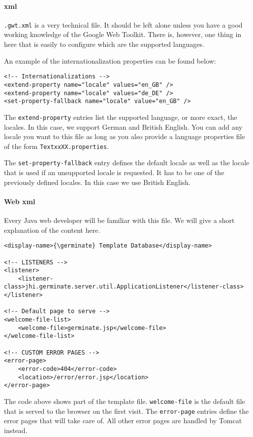 \paragraph{{\germinate} xml}
\texttt{{\germinate}.gwt.xml} is a very technical file. It should be left alone unless you have a good working knowledge of the Google Web Toolkit. There is, however, one thing in here that is easily to configure which are the supported languages.

An example of the internationalization properties can be found below:
\begin{lstlisting}[style=Xml]
<!-- Internationalizations -->
<extend-property name="locale" values="en_GB" />
<extend-property name="locale" values="de_DE" />
<set-property-fallback name="locale" value="en_GB" />
\end{lstlisting}
\noindent
The \texttt{extend-property} entries list the supported language, or more exact, the locales. In this case, we support German and British English. You can add any locale you want to this file as long as you also provide a language properties file of the form \texttt{Text\textunderscore xx\textunderscore XX.properties}.

The \texttt{set-property-fallback} entry defines the default locale as well as the locale that is used if an unsupported locale is requested. It has to be one of the previously defined locales. In this case we use British English.

\paragraph{Web xml}
Every Java web developer will be familiar with this file. We will give a short explanation of the content here.
\begin{lstlisting}[style=Xml]
<display-name>{\germinate} Template Database</display-name>

<!-- LISTENERS -->
<listener>
	<listener-class>jhi.germinate.server.util.ApplicationListener</listener-class>
</listener>

<!-- Default page to serve -->
<welcome-file-list>
	<welcome-file>germinate.jsp</welcome-file>
</welcome-file-list>

<!-- CUSTOM ERROR PAGES -->
<error-page>
    <error-code>404</error-code>
    <location>/error/error.jsp</location>
</error-page>
\end{lstlisting}
\noindent
The code above shows part of the template file. \texttt{welcome-file} is the default file that is served to the browser on the first visit. The \texttt{error-page} entries define the error pages that {\germinate} will take care of. All other error pages are handled by Tomcat instead.


